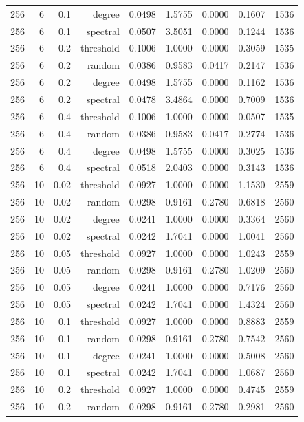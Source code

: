 \begin{table}[t]
\begin{tabular}{lrrrrrrrr}
256 & 6 & 0.1 & degree & 0.0498 & 1.5755 & 0.0000 & 0.1607 & 1536 \\
256 & 6 & 0.1 & spectral & 0.0507 & 3.5051 & 0.0000 & 0.1244 & 1536 \\
256 & 6 & 0.2 & threshold & 0.1006 & 1.0000 & 0.0000 & 0.3059 & 1535 \\
256 & 6 & 0.2 & random & 0.0386 & 0.9583 & 0.0417 & 0.2147 & 1536 \\
256 & 6 & 0.2 & degree & 0.0498 & 1.5755 & 0.0000 & 0.1162 & 1536 \\
256 & 6 & 0.2 & spectral & 0.0478 & 3.4864 & 0.0000 & 0.7009 & 1536 \\
256 & 6 & 0.4 & threshold & 0.1006 & 1.0000 & 0.0000 & 0.0507 & 1535 \\
256 & 6 & 0.4 & random & 0.0386 & 0.9583 & 0.0417 & 0.2774 & 1536 \\
256 & 6 & 0.4 & degree & 0.0498 & 1.5755 & 0.0000 & 0.3025 & 1536 \\
256 & 6 & 0.4 & spectral & 0.0518 & 2.0403 & 0.0000 & 0.3143 & 1536 \\
256 & 10 & 0.02 & threshold & 0.0927 & 1.0000 & 0.0000 & 1.1530 & 2559 \\
256 & 10 & 0.02 & random & 0.0298 & 0.9161 & 0.2780 & 0.6818 & 2560 \\
256 & 10 & 0.02 & degree & 0.0241 & 1.0000 & 0.0000 & 0.3364 & 2560 \\
256 & 10 & 0.02 & spectral & 0.0242 & 1.7041 & 0.0000 & 1.0041 & 2560 \\
256 & 10 & 0.05 & threshold & 0.0927 & 1.0000 & 0.0000 & 1.0243 & 2559 \\
256 & 10 & 0.05 & random & 0.0298 & 0.9161 & 0.2780 & 1.0209 & 2560 \\
256 & 10 & 0.05 & degree & 0.0241 & 1.0000 & 0.0000 & 0.7176 & 2560 \\
256 & 10 & 0.05 & spectral & 0.0242 & 1.7041 & 0.0000 & 1.4324 & 2560 \\
256 & 10 & 0.1 & threshold & 0.0927 & 1.0000 & 0.0000 & 0.8883 & 2559 \\
256 & 10 & 0.1 & random & 0.0298 & 0.9161 & 0.2780 & 0.7542 & 2560 \\
256 & 10 & 0.1 & degree & 0.0241 & 1.0000 & 0.0000 & 0.5008 & 2560 \\
256 & 10 & 0.1 & spectral & 0.0242 & 1.7041 & 0.0000 & 1.0687 & 2560 \\
256 & 10 & 0.2 & threshold & 0.0927 & 1.0000 & 0.0000 & 0.4745 & 2559 \\
256 & 10 & 0.2 & random & 0.0298 & 0.9161 & 0.2780 & 0.2981 & 2560 \\

\end{tabular}
\end{table}
